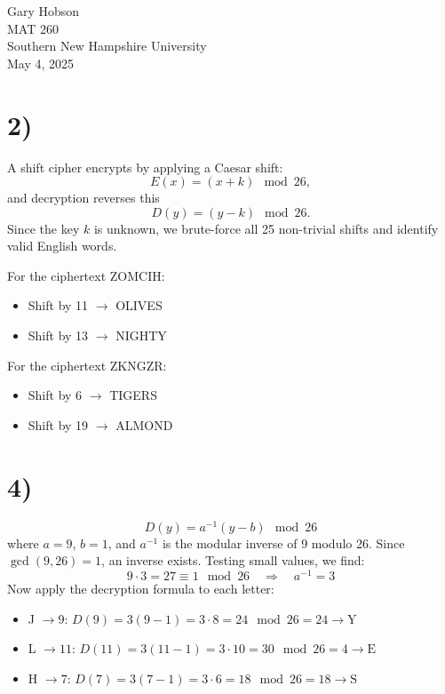 \documentclass[12pt]{article}
\begin{document}
Gary Hobson\\
MAT 260\\
Southern New Hampshire University\\
May 4, 2025\\
\section*{2)}
A shift cipher encrypts by applying a Caesar shift: 
\[
E(x) = (x + k) \mod 26,
\]
and decryption reverses this 
\[
D(y) = (y - k) \mod 26.
\]
Since the key \( k \) is unknown, we brute-force all 25 non-trivial shifts and identify valid English words.

For the ciphertext ZOMCIH:
\begin{itemize}
    \item Shift by 11 \( \rightarrow \) OLIVES
    \item Shift by 13 \( \rightarrow \) NIGHTY
\end{itemize}

For the ciphertext ZKNGZR:
\begin{itemize}
    \item Shift by 6 \( \rightarrow \) TIGERS
    \item Shift by 19 \( \rightarrow \) ALMOND
\end{itemize}
\newpage

\section*{4)}

\[
D(y) = a^{-1} (y - b) \mod 26
\]
where \( a = 9 \), \( b = 1 \), and \( a^{-1} \) is the modular inverse of 9 modulo 26. Since \( \gcd(9, 26) = 1 \), an inverse exists. Testing small values, we find:
\[
9 \cdot 3 = 27 \equiv 1 \mod 26 \quad \Rightarrow \quad a^{-1} = 3
\]
Now apply the decryption formula to each letter:

\begin{itemize}
    \item J \( \rightarrow 9 \): \quad 
    \( D(9) = 3 (9 - 1) = 3 \cdot 8 = 24 \mod 26 = 24 \rightarrow \text{Y} \)
    \item L \( \rightarrow 11 \): \quad 
    \( D(11) = 3 (11 - 1) = 3 \cdot 10 = 30 \mod 26 = 4 \rightarrow \text{E} \)
    \item H \( \rightarrow 7 \): \quad 
    \( D(7) = 3 (7 - 1) = 3 \cdot 6 = 18 \mod 26 = 18 \rightarrow \text{S} \)
\end{itemize}
\end{document}
